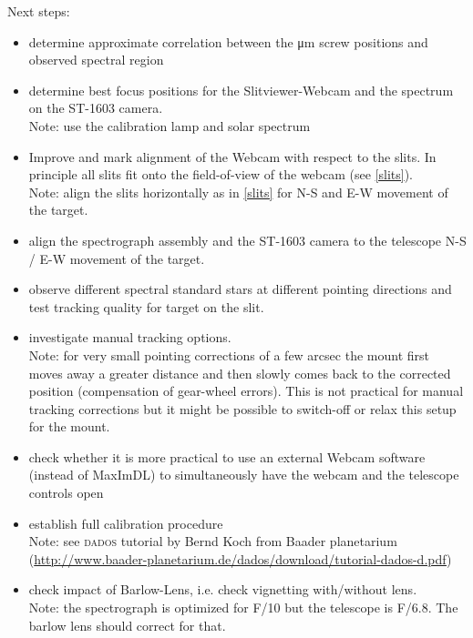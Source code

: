 \documentclass[a4paper, 11pt, fleqn]{memoir}
\begin{document}
Next steps:
\begin{itemize}
    \item determine approximate correlation between the \si{\um} screw positions and observed spectral region
    \item determine best focus positions for the Slitviewer-Webcam and the spectrum on the ST-1603 camera.
          \\ Note: use the calibration lamp and solar spectrum
    \item
          Improve and mark alignment of the Webcam with respect to the slits.
          In principle all slits fit onto the field-of-view of the webcam (see \cref{slits}).
          \\ Note: align the slits horizontally as in \cref{slits} for N-S
          and E-W movement of the target.
    \item
          align the spectrograph assembly and the ST-1603 camera to the telescope N-S /
          E-W movement of the target.
    \item
          observe different spectral standard stars at different pointing directions and
          test tracking quality for target on the slit.
    \item
          investigate manual tracking options. \\ Note: for very small pointing
          corrections of a few arcsec the mount first moves away a greater distance and
          then slowly comes back to the corrected position (compensation of gear-wheel
          errors).
          This is not practical for manual tracking corrections but it might be possible to switch-off or relax this setup for the mount.
    \item
          check whether it is more practical to use an external Webcam software (instead
          of MaxImDL) to simultaneously have the webcam and the telescope controls open
    \item
          establish full calibration procedure\\ Note: see \textsc{dados} tutorial by Bernd
          Koch from Baader planetarium \\
          (\url{http://www.baader-planetarium.de/dados/download/tutorial-dados-d.pdf})
    \item
          check impact of Barlow-Lens, i.e. check vignetting with/without lens.\\ Note:
          the spectrograph is optimized for F/10 but the telescope is F/6.8.
          The barlow lens should correct for that.
\end{itemize}
\end{document}
